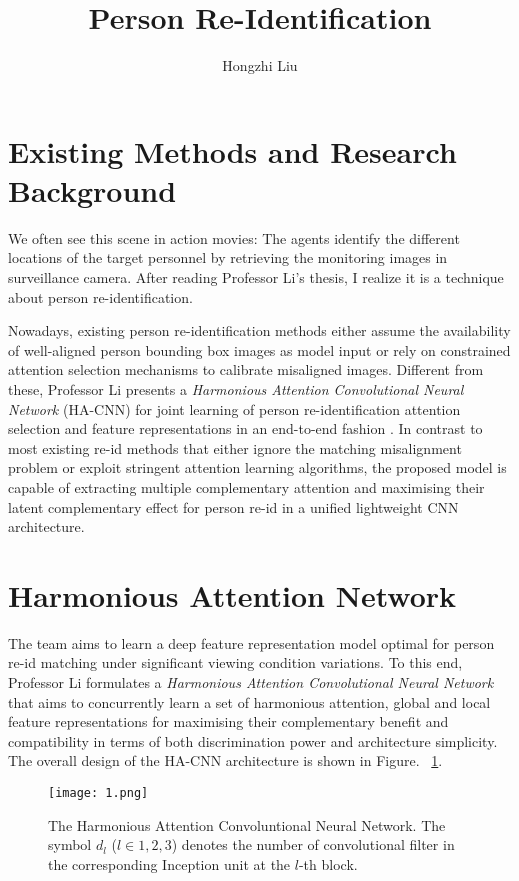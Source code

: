 \documentclass[twocolumn]{article}
\author{Hongzhi Liu}
\title{Person Re-Identification}
\begin{document}
	\maketitle
	\par
	\section{Existing Methods and Research Background}
	We often see this scene in action movies: The agents identify the different locations of the target personnel by retrieving the monitoring images in surveillance camera. After reading Professor Li's thesis, I realize it is a technique about person re-identification.
	
	Nowadays, existing person re-identification methods either assume the availability of well-aligned person bounding box images as model input or rely on constrained attention selection mechanisms to calibrate misaligned images. Different from these, Professor Li presents a \emph{Harmonious Attention Convolutional Neural Network} (HA-CNN) for joint learning of person re-identification attention selection and feature representations in an end-to-end fashion \cite{Li2018Harmonious}. In contrast to most existing re-id methods that either ignore the matching misalignment problem or exploit stringent attention learning algorithms, the proposed model is capable of extracting multiple complementary attention and maximising their latent complementary effect for person re-id in a unified lightweight CNN architecture.
	
	\section{Harmonious Attention Network}
	
	The team aims to learn a deep feature representation model optimal for person re-id matching under significant viewing condition variations. To this end, Professor Li formulates a \emph{Harmonious Attention Convolutional Neural Network} that aims to concurrently learn a set of harmonious attention, global and local feature representations for maximising their complementary benefit and compatibility in terms of both discrimination power and architecture simplicity. The overall design of the HA-CNN architecture is shown in Figure. ~\ref{fig-CNN}.
	
	\begin{figure}[ht]
		\centering
		\texttt{[image: 1.png]}
		\caption{The Harmonious Attention Convoluntional Neural Network. The symbol $d_{l}$ ($ l\in{1,2,3} $) denotes the number of convolutional filter in the corresponding Inception unit at the $l$-th block.}\label{fig-CNN}
	\end{figure}
\end{document}
